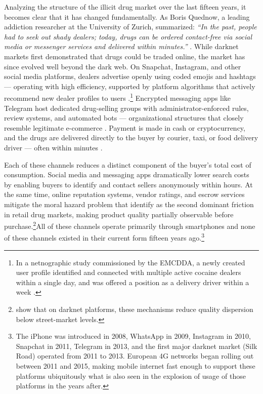 \documentclass[12pt, a4paper]{article}
\begin{document}
Analyzing the structure of the illicit drug market over the last fifteen years, it becomes clear that it has changed fundamentally. As Boris Quednow, a leading addiction researcher at the University of Zurich, summarized: \textit{``In the past, people had to seek out shady dealers; today, drugs can be ordered contact-free via social media or messenger services and delivered within minutes.''} \citep{quednow_uzh_2025}. While darknet markets first 
demonstrated that drugs could be traded online, the market has since evolved well beyond the dark web. On Snapchat, Instagram, and other social media platforms, dealers advertise openly using coded emojis and hashtags --- operating with high efficiency, supported by platform algorithms that actively recommend new dealer profiles to users \citep{demant_emcdda_2023}.\footnote{In a netnographic study commissioned by the EMCDDA, a newly created user 
profile identified and connected with multiple active cocaine dealers within a single day, and was offered a position as a delivery driver within a week \citep{demant_emcdda_2023}.} Encrypted messaging apps like Telegram host dedicated drug-selling groups with administrator-enforced rules, review systems, and automated bots --- organizational structures that closely resemble legitimate e-commerce \citep{dewey_2024_telegram}. Payment is made in cash or cryptocurrency, and the drugs are delivered directly to the buyer by courier, taxi, or food delivery driver --- often within minutes \citep{demant_emcdda_2023, moyle_2019_drugsforsale}.


\noindent Each of these channels reduces a distinct component of the buyer's total cost of consumption. Social media and messaging apps dramatically lower search costs by enabling buyers to identify and contact sellers anonymously within hours. At the same time, online reputation systems, vendor ratings, and escrow services mitigate the moral hazard problem that \citet{galenianos_2017} identify as the second dominant friction in retail drug markets, making product quality partially observable before purchase.\footnote{\citet{bhaskar_2019} show that on darknet platforms, these mechanisms reduce quality dispersion below street-market levels.}All of these channels operate primarily through smartphones and none of these channels existed in their current form fifteen years ago.\footnote{The iPhone was introduced in 2008, WhatsApp in 2009, Instagram in 2010, Snapchat in 2011, Telegram in 2013, and the first major darknet market (Silk Road) operated from 2011 to 2013. European 4G networks began rolling out between 2011 and 2015, making mobile internet fast enough to support these platforms ubiquitously what is also seen in the explosion of usage of those platforms in the years after.}
\end{document}
